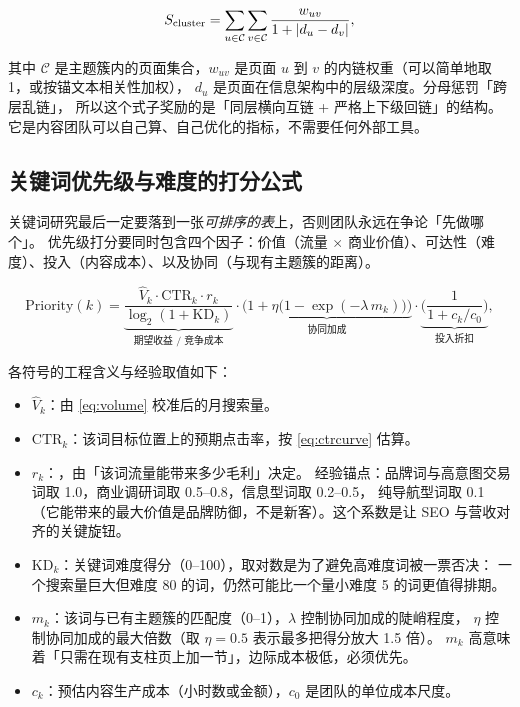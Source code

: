 \begin{equation}
S_{\text{cluster}} = \sum_{u \in \mathcal{C}} \sum_{v \in \mathcal{C}} \frac{w_{uv}}{1 + \left\lvert d_u - d_v \right\rvert} ,
\label{eq:clustercohesion}
\end{equation}

其中 $\mathcal{C}$ 是主题簇内的页面集合，$w_{uv}$ 是页面 $u$ 到 $v$ 的内链权重（可以简单地取 1，或按锚文本相关性加权），
$d_u$ 是页面在信息架构中的层级深度。分母惩罚「跨层乱链」，
所以这个式子奖励的是「同层横向互链 + 严格上下级回链」的结构。
它是内容团队可以自己算、自己优化的指标，不需要任何外部工具。

\subsection{关键词优先级与难度的打分公式}

关键词研究最后一定要落到一张\emph{可排序的表}上，否则团队永远在争论「先做哪个」。
优先级打分要同时包含四个因子：价值（流量 $\times$ 商业价值）、可达性（难度）、投入（内容成本）、以及协同（与现有主题簇的距离）。

\begin{equation}
\text{Priority}(k) =
\underbrace{\frac{\hat{V}_k \cdot \text{CTR}_k \cdot r_k}{\log_2 (1 + \text{KD}_k)}}_{\text{期望收益 / 竞争成本}}
\cdot
\underbrace{\Big(1 + \eta \big(1 - \exp(-\lambda \, m_k)\big)\Big)}_{\text{协同加成}}
\cdot
\underbrace{\Big(\frac{1}{1 + c_k / c_0}\Big)}_{\text{投入折扣}} ,
\label{eq:kwpriority}
\end{equation}

各符号的工程含义与经验取值如下：

\begin{itemize}
  \item $\hat{V}_k$：由 \cref{eq:volume} 校准后的月搜索量。
  \item $\text{CTR}_k$：该词目标位置上的预期点击率，按 \cref{eq:ctrcurve} 估算。
  \item $r_k$：，由「该词流量能带来多少毛利」决定。
        经验锚点：品牌词与高意图交易词取 1.0，商业调研词取 0.5--0.8，信息型词取 0.2--0.5，
        纯导航型词取 0.1（它能带来的最大价值是品牌防御，不是新客）。这个系数是让 SEO 与营收对齐的关键旋钮。
  \item $\text{KD}_k$：关键词难度得分（0--100），取对数是为了避免高难度词被一票否决：
        一个搜索量巨大但难度 80 的词，仍然可能比一个量小难度 5 的词更值得排期。
  \item $m_k$：该词与已有主题簇的匹配度（0--1），$\lambda$ 控制协同加成的陡峭程度，
        $\eta$ 控制协同加成的最大倍数（取 $\eta = 0.5$ 表示最多把得分放大 1.5 倍）。
        $m_k$ 高意味着「只需在现有支柱页上加一节」，边际成本极低，必须优先。
  \item $c_k$：预估内容生产成本（小时数或金额），$c_0$ 是团队的单位成本尺度。
\end{itemize}

